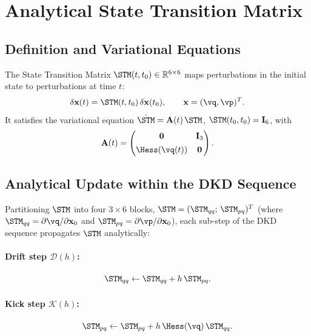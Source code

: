 
\section{Analytical State Transition Matrix}
\label{sec:stm}

\subsection{Definition and Variational Equations}
\label{sec:stm_def}

The State Transition Matrix $\STM(t, t_0) \in \mathbb{R}^{6\times6}$
maps perturbations in the initial state to perturbations at time $t$:
\begin{equation}
  \delta\mathbf{x}(t) = \STM(t, t_0)\,\delta\mathbf{x}(t_0),
  \qquad
  \mathbf{x} = (\vq, \vp)^T.
  \label{eq:stm_def}
\end{equation}
It satisfies the variational equation
$\dot{\STM} = \mathbf{A}(t)\,\STM$,
$\STM(t_0,t_0) = \mathbf{I}_6$, with
\begin{equation}
  \mathbf{A}(t) =
  \begin{pmatrix}
    \mathbf{0} & \mathbf{I}_3 \\[4pt]
    \Hess(\vq(t)) & \mathbf{0}
  \end{pmatrix}.
  \label{eq:A_matrix}
\end{equation}

\subsection{Analytical Update within the DKD Sequence}
\label{sec:stm_update}

Partitioning $\STM$ into four $3\times 6$ blocks,
$\STM = (\STM_{qq};\,\STM_{pq})^T$
(where $\STM_{qq} = \partial\vq/\partial\mathbf{x}_0$ and
$\STM_{pq} = \partial\vp/\partial\mathbf{x}_0$), each
sub-step of the DKD sequence propagates $\STM$ analytically:

\paragraph{Drift step $\mathcal{D}(h)$:}
\begin{equation}
  \STM_{qq} \leftarrow \STM_{qq} + h\,\STM_{pq}.
  \label{eq:stm_drift}
\end{equation}

\paragraph{Kick step $\mathcal{K}(h)$:}
\begin{equation}
  \STM_{pq} \leftarrow \STM_{pq} + h\,\Hess(\vq)\,\STM_{qq}.
  \label{eq:stm_kick}
\end{equation}

